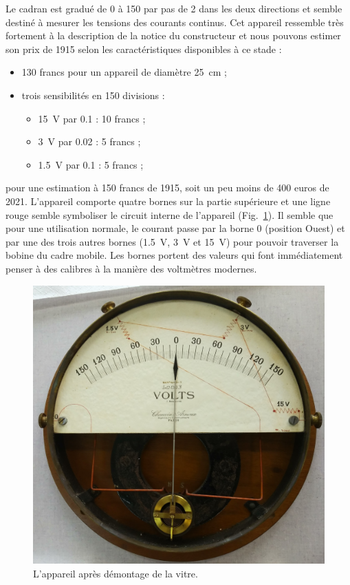 \documentclass[12pt,a4paper,fleqn]{article}
\begin{document}
Le cadran est gradué de 0 à 150 par pas de 2 dans les deux directions et semble destiné à mesurer les tensions des courants continus.
Cet appareil ressemble très fortement à la description de la notice du constructeur et nous pouvons estimer son prix de 1915 selon les caractéristiques disponibles à ce stade :
\begin{itemize}
\item 130 francs pour un appareil de diamètre \SI{25}{\centi\metre} ;
\item trois sensibilités en 150 divisions :
\begin{itemize}
\item \SI{15}{V} par \num{0.1} : 10 francs ;
\item \SI{3}{V} par \num{0.02} : 5 francs ;
\item \SI{1.5}{V} par \num{0.1} : 5 francs ;
\end{itemize}
\end{itemize}
pour une estimation à 150 francs de 1915,  soit un peu moins de 400 euros de 2021.
L'appareil comporte quatre \og bornes \fg{} sur la partie supérieure et une ligne rouge semble symboliser le circuit interne de l'appareil (Fig.~\ref{fig:galva_volt_glass}).
Il semble que pour une utilisation normale, le courant passe par la borne 0 (position Ouest) et par une des trois autres bornes (\SI{1.5}{V}, \SI{3}{V} et \SI{15}{V}) pour pouvoir traverser la bobine du cadre mobile.
Les bornes portent des valeurs qui font immédiatement penser à des calibres à la manière des voltmètres modernes.
\begin{figure}
    \center
    \includegraphics[height=300 pt]{images/20210205_152634.jpg}
    \caption{L'appareil après démontage de la vitre.}
    \label{fig:galva_volt_glass}
\end{figure}
\end{document}
